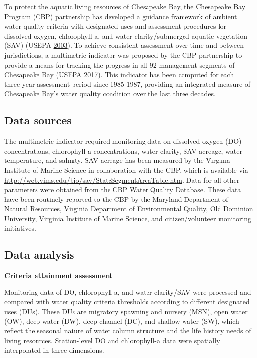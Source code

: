 \documentclass[
]{book}
\begin{document}
To protect the aquatic living resources of Chesapeake Bay, the \href{https://www.chesapeakebay.net/}{Chesapeake Bay Program} (CBP) partnership has developed a guidance framework of ambient water quality criteria with designated uses and assessment procedures for dissolved oxygen, chlorophyll-a, and water clarity/submerged aquatic vegetation (SAV) (USEPA \protect\hyperlink{ref-usepa2003}{2003}). To achieve consistent assessment over time and between jurisdictions, a multimetric indicator was proposed by the CBP partnership to provide a means for tracking the progress in all 92 management segments of Chesapeake Bay (USEPA \protect\hyperlink{ref-usepa2017}{2017}). This indicator has been computed for each three-year assessment period since 1985-1987, providing an integrated measure of Chesapeake Bay's water quality condition over the last three decades.

\hypertarget{data-sources-7}{%
\subsection{Data sources}\label{data-sources-7}}

The multimetric indicator required monitoring data on dissolved oxygen (DO) concentrations, chlorophyll-a concentrations, water clarity, SAV acreage, water temperature, and salinity. SAV acreage has been measured by the Virginia Institute of Marine Science in collaboration with the CBP, which is available via \url{http://web.vims.edu/bio/sav/StateSegmentAreaTable.htm}. Data for all other parameters were obtained from the \href{http://www.chesapeakebay.net/data/downloads/cbp_water_quality_database_1984_present}{CBP Water Quality Database}. These data have been routinely reported to the CBP by the Maryland Department of Natural Resources, Virginia Department of Environmental Quality, Old Dominion University, Virginia Institute of Marine Science, and citizen/volunteer monitoring initiatives.

\hypertarget{data-analysis-6}{%
\subsection{Data analysis}\label{data-analysis-6}}

\textbf{Criteria attainment assessment}

Monitoring data of DO, chlorophyll-a, and water clarity/SAV were processed and compared with water quality criteria thresholds according to different designated uses (DUs). These DUs are migratory spawning and nursery (MSN), open water (OW), deep water (DW), deep channel (DC), and shallow water (SW), which reflect the seasonal nature of water column structure and the life history needs of living resources. Station-level DO and chlorophyll-a data were spatially interpolated in three dimensions.
\end{document}
